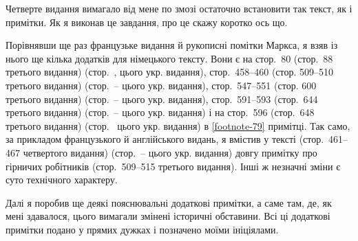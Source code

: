 
\vspace{\bigskipamount}

Четверте видання вимагало від мене по змозі остаточно встановити
так текст, як і примітки. Як я виконав це завдання, про
це скажу коротко ось що.

Порівнявши ще раз французьке видання й рукописні помітки
Маркса, я взяв із нього ще кілька додатків для німецького тексту.
Вони є на стор.~80 (стор.~88 третього видання)
(стор.~\pageref{original-71}, \pageref{original-72} цього
укр. видання), стор.~458--460 (стор. 509--510 третього видання)
(стор.~\pageref{original-414}--\pageref{original-416} цього укр. видання),
стор.~547--551 (стор. 600 третього видання)
(стор.~\pageref{original-496}--\pageref{original-499} цього укр. видання),
стор.~591--593 (стор.~644 третього видання)
(стор.~\pageref{original-538}--\pageref{original-540} цього укр. видання) і на стор.~596 (стор.~648 третього видання)
(стор.~\pageref{footnote-79} цього укр. видання) в \ref{footnote-79} примітці. Так само, за прикладом французького
й англійського видань, я вмістив у тексті (стор.~461--467 четвертого видання)
(стор.~\pageref{original-416}--\pageref{original-422} цього укр. видання)
довгу примітку про гірничих робітників (стор.~509--515 третього
видання). Інші ж незначні зміни є суто технічного характеру.

Далі я поробив ще деякі пояснювальні додаткові примітки,
а саме там, де, як мені здавалося, цього вимагали змінені історичні
обставини. Всі ці додаткові примітки подано у прямих дужках
і позначено моїми ініціялами.

